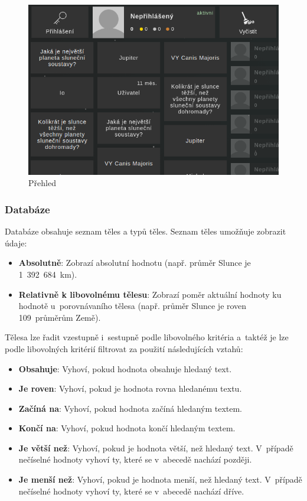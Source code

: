 \documentclass[a4paper,12pt]{article}
\begin{document}
\begin{figure}[H]
\begin{center}
\includegraphics[width=350pt]{Images/Overview.png}
\caption{Přehled}
\end{center}
\end{figure}

\vspace*{-1cm}
\subsubsection{Databáze}

Databáze obsahuje seznam těles a typů těles. Seznam těles umožňuje zobrazit údaje:

\begin{itemize}
\item \textbf{Absolutně}: Zobrazí absolutní hodnotu (např. průměr Slunce je 1~392~684~km).
\item \textbf{Relativně k libovolnému tělesu}: Zobrazí poměr aktuální hodnoty ku hodnotě u~porovnávaního tělesa (např. průměr Slunce je roven 109~průměrům Země).
\end{itemize}

Tělesa lze řadit vzestupně i~sestupně podle libovolného kritéria a~taktéž je lze podle libovolných kritérií filtrovat za použití následujících vztahů:

\begin{itemize}
\item \textbf{Obsahuje}: Vyhoví, pokud hodnota obsahuje hledaný text.
\item \textbf{Je roven}: Vyhoví, pokud je hodnota rovna hledanému textu.
\item \textbf{Začíná na}: Vyhoví, pokud hodnota začíná hledaným textem.
\item \textbf{Končí na}: Vyhoví, pokud hodnota končí hledaným textem.
\item \textbf{Je větší než}: Vyhoví, pokud je hodnota větší, než hledaný text. V~případě nečíselné hodnoty vyhoví ty, které se v~abecedě nachází později.
\item \textbf{Je menší než}: Vyhoví, pokud je hodnota menší, než hledaný text. V~případě nečíselné hodnoty vyhoví ty, které se v~abecedě nachází dříve.
\end{itemize} 
\end{document}
